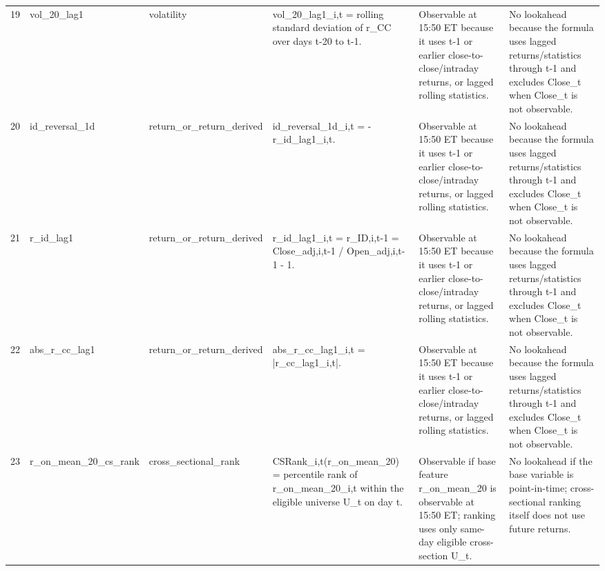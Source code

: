 \begin{landscape}
\begin{longtable}{P{0.42cm} P{2.25cm} P{2.05cm} P{5.25cm} P{4.85cm} P{5.25cm}}
19 & vol\_\allowbreak{}20\_\allowbreak{}lag1 & volatility & vol\_\allowbreak{}20\_\allowbreak{}lag1\_\allowbreak{}i,t = rolling standard deviation of r\_\allowbreak{}CC over days t-20 to t-1. & Observable at 15:50 ET because it uses t-1 or earlier close-to-close/intraday returns, or lagged rolling statistics. & No lookahead because the formula uses lagged returns/statistics through t-1 and excludes Close\_\allowbreak{}t when Close\_\allowbreak{}t is not observable. \\
20 & id\_\allowbreak{}reversal\_\allowbreak{}1d & return\_\allowbreak{}or\_\allowbreak{}return\_\allowbreak{}derived & id\_\allowbreak{}reversal\_\allowbreak{}1d\_\allowbreak{}i,t = - r\_\allowbreak{}id\_\allowbreak{}lag1\_\allowbreak{}i,t. & Observable at 15:50 ET because it uses t-1 or earlier close-to-close/intraday returns, or lagged rolling statistics. & No lookahead because the formula uses lagged returns/statistics through t-1 and excludes Close\_\allowbreak{}t when Close\_\allowbreak{}t is not observable. \\
21 & r\_\allowbreak{}id\_\allowbreak{}lag1 & return\_\allowbreak{}or\_\allowbreak{}return\_\allowbreak{}derived & r\_\allowbreak{}id\_\allowbreak{}lag1\_\allowbreak{}i,t = r\_\allowbreak{}ID,i,t-1 = Close\_\allowbreak{}adj,i,t-1 / Open\_\allowbreak{}adj,i,t-1 - 1. & Observable at 15:50 ET because it uses t-1 or earlier close-to-close/intraday returns, or lagged rolling statistics. & No lookahead because the formula uses lagged returns/statistics through t-1 and excludes Close\_\allowbreak{}t when Close\_\allowbreak{}t is not observable. \\
22 & abs\_\allowbreak{}r\_\allowbreak{}cc\_\allowbreak{}lag1 & return\_\allowbreak{}or\_\allowbreak{}return\_\allowbreak{}derived & abs\_\allowbreak{}r\_\allowbreak{}cc\_\allowbreak{}lag1\_\allowbreak{}i,t = |r\_\allowbreak{}cc\_\allowbreak{}lag1\_\allowbreak{}i,t|. & Observable at 15:50 ET because it uses t-1 or earlier close-to-close/intraday returns, or lagged rolling statistics. & No lookahead because the formula uses lagged returns/statistics through t-1 and excludes Close\_\allowbreak{}t when Close\_\allowbreak{}t is not observable. \\
23 & r\_\allowbreak{}on\_\allowbreak{}mean\_\allowbreak{}20\_\allowbreak{}cs\_\allowbreak{}rank & cross\_\allowbreak{}sectional\_\allowbreak{}rank & CSRank\_\allowbreak{}i,t(r\_\allowbreak{}on\_\allowbreak{}mean\_\allowbreak{}20) = percentile rank of r\_\allowbreak{}on\_\allowbreak{}mean\_\allowbreak{}20\_\allowbreak{}i,t within the eligible universe U\_\allowbreak{}t on day t. & Observable if base feature r\_\allowbreak{}on\_\allowbreak{}mean\_\allowbreak{}20 is observable at 15:50 ET; ranking uses only same-day eligible cross-section U\_\allowbreak{}t. & No lookahead if the base variable is point-in-time; cross-sectional ranking itself does not use future returns. \\

\end{longtable}
\end{landscape}
